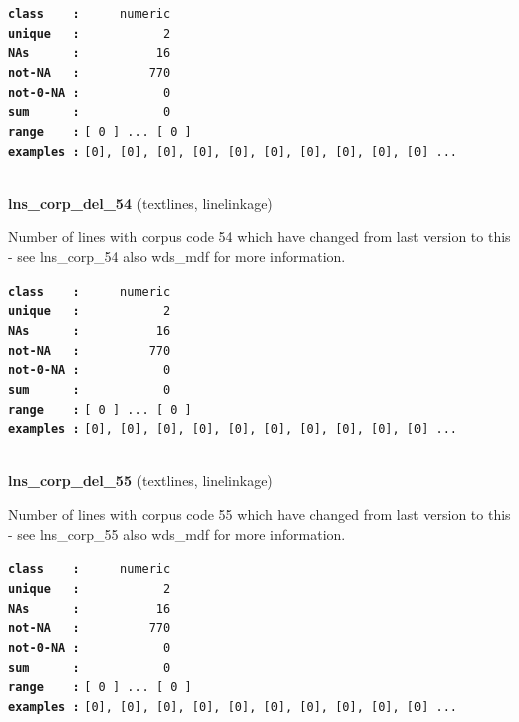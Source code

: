 \documentclass[]{article}
\begin{document}
\textbf{\texttt{class\ \ \ \ :}} \texttt{~~~~~numeric}\\
\textbf{\texttt{unique\ \ \ :}} \texttt{~~~~~~~~~~~2}\\
\textbf{\texttt{NAs\ \ \ \ \ \ :}} \texttt{~~~~~~~~~~16}\\
\textbf{\texttt{not-NA\ \ \ :}} \texttt{~~~~~~~~~770}\\
\textbf{\texttt{not-0-NA\ :}} \texttt{~~~~~~~~~~~0}\\
\textbf{\texttt{sum\ \ \ \ \ \ :}} \texttt{~~~~~~~~~~~0}\\
\textbf{\texttt{range\ \ \ \ :}}
\texttt{{[}\ 0\ {]}\ ...\ {[}\ 0\ {]}}\\
\textbf{\texttt{examples\ :}}
\texttt{{[}0{]},\ {[}0{]},\ {[}0{]},\ {[}0{]},\ {[}0{]},\ {[}0{]},\ {[}0{]},\ {[}0{]},\ {[}0{]},\ {[}0{]}\ ...}\\

~

\textbf{lns\_corp\_del\_54} (textlines, linelinkage)

Number of lines with corpus code 54 which have changed from last version
to this - see lns\_corp\_54 also wds\_mdf for more information.

\textbf{\texttt{class\ \ \ \ :}} \texttt{~~~~~numeric}\\
\textbf{\texttt{unique\ \ \ :}} \texttt{~~~~~~~~~~~2}\\
\textbf{\texttt{NAs\ \ \ \ \ \ :}} \texttt{~~~~~~~~~~16}\\
\textbf{\texttt{not-NA\ \ \ :}} \texttt{~~~~~~~~~770}\\
\textbf{\texttt{not-0-NA\ :}} \texttt{~~~~~~~~~~~0}\\
\textbf{\texttt{sum\ \ \ \ \ \ :}} \texttt{~~~~~~~~~~~0}\\
\textbf{\texttt{range\ \ \ \ :}}
\texttt{{[}\ 0\ {]}\ ...\ {[}\ 0\ {]}}\\
\textbf{\texttt{examples\ :}}
\texttt{{[}0{]},\ {[}0{]},\ {[}0{]},\ {[}0{]},\ {[}0{]},\ {[}0{]},\ {[}0{]},\ {[}0{]},\ {[}0{]},\ {[}0{]}\ ...}\\

~

\textbf{lns\_corp\_del\_55} (textlines, linelinkage)

Number of lines with corpus code 55 which have changed from last version
to this - see lns\_corp\_55 also wds\_mdf for more information.

\textbf{\texttt{class\ \ \ \ :}} \texttt{~~~~~numeric}\\
\textbf{\texttt{unique\ \ \ :}} \texttt{~~~~~~~~~~~2}\\
\textbf{\texttt{NAs\ \ \ \ \ \ :}} \texttt{~~~~~~~~~~16}\\
\textbf{\texttt{not-NA\ \ \ :}} \texttt{~~~~~~~~~770}\\
\textbf{\texttt{not-0-NA\ :}} \texttt{~~~~~~~~~~~0}\\
\textbf{\texttt{sum\ \ \ \ \ \ :}} \texttt{~~~~~~~~~~~0}\\
\textbf{\texttt{range\ \ \ \ :}}
\texttt{{[}\ 0\ {]}\ ...\ {[}\ 0\ {]}}\\
\textbf{\texttt{examples\ :}}
\texttt{{[}0{]},\ {[}0{]},\ {[}0{]},\ {[}0{]},\ {[}0{]},\ {[}0{]},\ {[}0{]},\ {[}0{]},\ {[}0{]},\ {[}0{]}\ ...}\\
\end{document}
